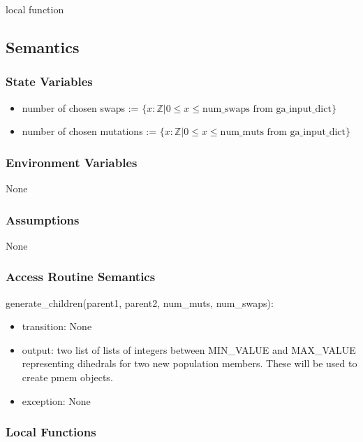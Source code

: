 \documentclass[12pt, titlepage]{article}
\begin{document}
\noindent * local function

\subsection{Semantics}

\subsubsection{State Variables}

\begin{itemize}
	\item number of chosen swaps := $\{ x : \mathbb{Z} | 0 \leq x \leq 
	\text{num\_swaps from ga\_input\_dict}\}$
	\item number of chosen mutations := $\{ x : \mathbb{Z} | 0 \leq x \leq 
	\text{num\_muts from ga\_input\_dict}\}$
\end{itemize}

\subsubsection{Environment Variables}

None

\subsubsection{Assumptions}

None 

\subsubsection{Access Routine Semantics}

\noindent generate\_children(parent1, parent2, num\_muts, num\_swaps):
\begin{itemize}
	\item transition: None
	\item output: two list of lists of integers between MIN\_VALUE and 
	MAX\_VALUE representing dihedrals for two new population members. These 
	will be used to create pmem objects.
	\item exception: None
\end{itemize}

\subsubsection{Local Functions}
\end{document}

